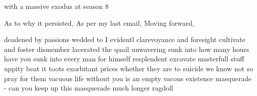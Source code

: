 with a massive exodus at season 8

%
As to why it persisted, As per my last email, Moving forward,


deadened by passions wedded to
I evidentl
clarevoyance and foresight
cultivate and foster
dismember lacerated the quail
unwavering
sunk into how many hours have you sunk into
every man for himself resplendent
excavate
masterfull stuff
uppity
beat it toots
exorbitant prices
whether they are to suicide we know not so pray for them
vacuous life without you is an empty vacous existence
masquerade - can you keep up this masquerade much longer
ragdoll



